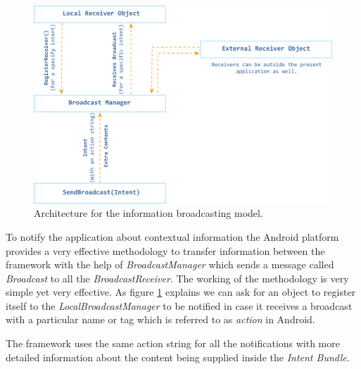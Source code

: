 \documentclass[12pt]{report}
\begin{document}
\begin{figure}[hbtp]
 \centering
 \includegraphics[width=130mm]{BroadcastReceiverModel.png}
  \caption[Architecture for the information broadcasting model.]{Architecture for the information broadcasting model.}
 \label{figure:BroadcastRecevierModel}
\end{figure}

To notify the application about contextual information the Android platform provides a very effective methodology to transfer information between the framework with the help of \textit{BroadcastManager} which sends a message called \textit{Broadcast} to all the \textit{BroadcastReceiver}. The working of the methodology is very simple yet very effective. As figure \ref{figure:BroadcastRecevierModel} explains we can ask for an object to register itself to the \textit{LocalBroadcastManager} to be notified in case it receives a broadcast with a particular name or tag which is referred to as \textit{action} in Android.

The framework uses the same action string for all the notifications with more detailed information about the content being supplied inside the \textit{Intent Bundle}.
\end{document}
